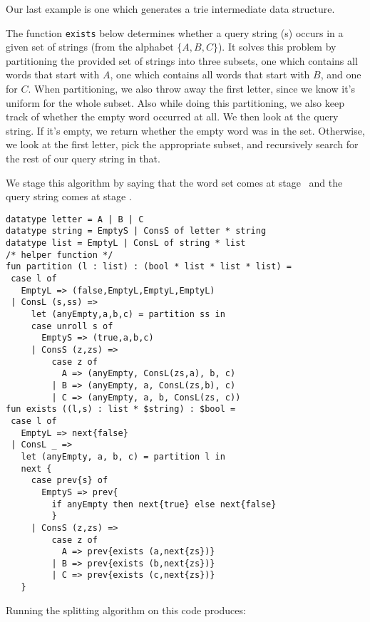 Our last example is one which generates a trie intermediate data structure.

The function {\tt exists} below determines whether a query string (s) occurs in a given set of strings (from the alphabet $\{A, B,C\}$).
It solves this problem by partitioning the provided set of strings into three subsets,
one which contains all words that start with $A$,
one which contains all words that start with $B$, and one for $C$.
When partitioning, we also throw away the first letter, since we know it's uniform for the whole subset.
Also while doing this partitioning, we also keep track of whether the empty word occurred at all.
We then look at the query string.  If it's empty, we return whether the empty word was in the set.
Otherwise, we look at the first letter, pick the appropriate subset, 
and recursively search for the rest of our query string in that.

We stage this algorithm by saying that the word set comes at stage \bbone\
and the query string comes at stage \bbtwo.

\begin{lstlisting} 
datatype letter = A | B | C
datatype string = EmptyS | ConsS of letter * string
datatype list = EmptyL | ConsL of string * list
/* helper function */
fun partition (l : list) : (bool * list * list * list) =
 case l of
   EmptyL => (false,EmptyL,EmptyL,EmptyL)
 | ConsL (s,ss) =>
     let (anyEmpty,a,b,c) = partition ss in
     case unroll s of
       EmptyS => (true,a,b,c)
     | ConsS (z,zs) =>
         case z of 
           A => (anyEmpty, ConsL(zs,a), b, c) 
         | B => (anyEmpty, a, ConsL(zs,b), c) 
         | C => (anyEmpty, a, b, ConsL(zs, c))
fun exists ((l,s) : list * $string) : $bool =
 case l of 
   EmptyL => next{false} 
 | ConsL _ => 
   let (anyEmpty, a, b, c) = partition l in
   next {
     case prev{s} of
       EmptyS => prev{
         if anyEmpty then next{true} else next{false}
         }
     | ConsS (z,zs) =>
         case z of
           A => prev{exists (a,next{zs})}
         | B => prev{exists (b,next{zs})} 
         | C => prev{exists (c,next{zs})}
   }
\end{lstlisting}

\noindent
Running the splitting algorithm on this code produces:

